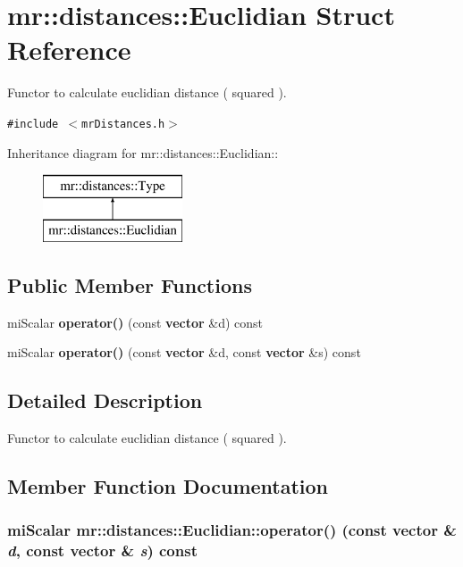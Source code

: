 \section{mr::distances::Euclidian Struct Reference}
\label{structmr_1_1distances_1_1Euclidian}
Functor to calculate euclidian distance ( squared ).  


{\tt \#include $<$mr\-Distances.h$>$}

Inheritance diagram for mr::distances::Euclidian::\begin{figure}[H]
\begin{center}
\leavevmode
\includegraphics[height=2cm]{structmr_1_1distances_1_1Euclidian}
\end{center}
\end{figure}
\subsection*{Public Member Functions}
\begin{CompactItemize}
\item 
mi\-Scalar {\bf operator()} (const {\bf vector} \&d) const 
\item 
mi\-Scalar {\bf operator()} (const {\bf vector} \&d, const {\bf vector} \&s) const 
\end{CompactItemize}


\subsection{Detailed Description}
Functor to calculate euclidian distance ( squared ). 



\subsection{Member Function Documentation}
\subsubsection{\setlength{\rightskip}{0pt plus 5cm}mi\-Scalar mr::distances::Euclidian::operator() (const {\bf vector} \& {\em d}, const {\bf vector} \& {\em s}) const\hspace{0.3cm}{\tt  [inline, virtual]}}\label{structmr_1_1distances_1_1Euclidian_a1}




